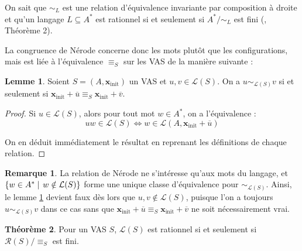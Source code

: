 \documentclass[a4paper,final]{article}
\theoremstyle{definition}
\newtheorem{Theorem}{Théorème}
\newtheorem{Lemma}[Theorem]{Lemme}
\newtheorem*{Remark}{Remarque}
\newcommand{\alain}[1]{\textcolor{blue}{#1}}
\newcommand{\set}[2]{\left\{#1\mathrel{\left|\vphantom{#1}\vphantom{#2}\right.}#2\right\}}
\newcommand{\lang}{\ensuremath{\mathcal{L}}}
\newcommand{\conf}{\ensuremath{\mathcal{R}}}
\newcommand{\vect}[1]{\ensuremath{\mathbf{#1}}}
\newcommand{\rel}{\ensuremath{\equiv}}
\newcommand{\ssi}{\ensuremath{\text{ ssi }}}
\newcommand{\equivaut}{\ensuremath{\Leftrightarrow}}
\newcommand{\xinit}{\ensuremath{\vect{x}_\text{init}}}
\newcommand{\valeur}[1]{\ensuremath{\overline{#1}}}
\begin{document}

On sait que $\sim_L$ est une relation d'équivalence invariante par composition à droite et qu'un langage $L \subseteq A^*$ est rationnel si et seulement si $A^*/\sim_L$ est fini (\cite{rasc59}, Théorème 2).


La congruence de Nérode concerne donc les mots plutôt que les configurations, mais est liée à l'équivalence $ \rel_S$ sur les VAS de la manière suivante :

\begin{Lemma}\label{lien avec Nérode}
    Soient $S=(A,\xinit)$ un VAS et $u,v\in\lang(S)$.
    On a $u\sim_{\lang(S)}v$ si et seulement si $\xinit +\valeur{u} \rel_S \xinit +\valeur{v}$.
\end{Lemma}

\begin{proof}
Si $u\in\lang(S)$, alors pour tout mot $w\in A^\ast$, on a l'équivalence :
$$uw\in\lang(S) \equivaut w\in\lang(A,\xinit +\valeur{u})$$

On en déduit immédiatement le résultat en reprenant les définitions de chaque relation.
\end{proof}


\begin{Remark}
La relation de Nérode ne s'intéresse qu'aux mots du langage, et $\set{w\in A^\ast}{w\notin\lang(S)}$ forme une unique classe d'équivalence pour $\sim_{\lang(S)}$.
Ainsi, le lemme \ref{lien avec Nérode} devient faux dès lors que $u,v\notin\lang(S)$, puisque l'on a toujours $u\sim_{\lang(S)}v$ dans ce cas sans que $\xinit +\valeur{u} \rel_S \xinit +\valeur{v}$ ne soit nécessairement vrai.
\end{Remark}


\begin{Theorem}\label{lien relation-rationnel}
    Pour un VAS $S$, $\lang(S)$ est rationnel si et seulement si $\conf(S)/\rel_S$ est fini.
\end{Theorem}
\end{document}
